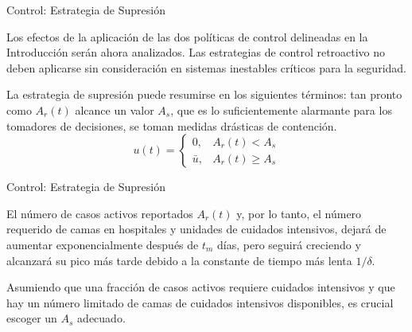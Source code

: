 \documentclass{beamer}
\begin{document}
\begin{frame}{Control: Estrategia de Supresión}
\begin{justify}
\small
Los efectos de la aplicación de las dos políticas de control delineadas en la Introducción serán ahora analizados. Las estrategias de control retroactivo no deben aplicarse sin consideración en sistemas inestables críticos para la seguridad.

\vspace{0.3cm}
La estrategia de supresión puede resumirse en los siguientes términos: tan pronto como \( A_r(t) \) alcance un valor \( A_s \), que es lo suficientemente alarmante para los tomadores de decisiones, se toman medidas drásticas de contención.
\[
u(t) =
\begin{cases}
0, & A_r(t) < A_s \\
\bar{u}, & A_r(t) \geq A_s
\end{cases}
\]

\vspace{0.3cm}
\end{justify}
\end{frame}


\begin{frame}{Control: Estrategia de Supresión}
\begin{justify}
\small
El número de casos activos reportados \( A_r(t) \) y, por lo tanto, el número requerido de camas en hospitales y unidades de cuidados intensivos, dejará de aumentar exponencialmente después de \( t_m \) días, pero seguirá creciendo y alcanzará su pico más tarde debido a la constante de tiempo más lenta \( 1/\delta \).

\vspace{0.3cm}
Asumiendo que una fracción de casos activos requiere cuidados intensivos y que hay un número limitado de camas de cuidados intensivos disponibles, es crucial escoger un \( A_s \) adecuado. %
%
\end{justify}
\end{frame}
\end{document}
